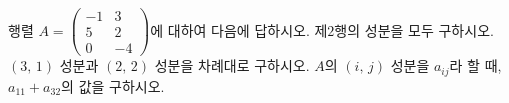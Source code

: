 \hspace*{2mm}\begin{minipage}[t]{\dimexpr\linewidth-2mm\relax}\vspace{0pt}
행렬 $A=\begin{pmatrix} -1 & 3 \\ 5 & 2 \\ 0 & -4 \end{pmatrix}$에 대하여 다음에 답하시오.
 제$2$행의 성분을 모두 구하시오.
 $(3,\,1)$ 성분과 $(2,\,2)$ 성분을 차례대로 구하시오.
 $A$의 $(i,\,j)$ 성분을 $a_{ij}$라 할 때, $a_{11}+a_{32}$의 값을 구하시오. \end{minipage}
